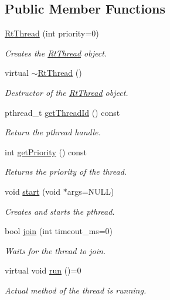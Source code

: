 \subsection*{\-Public \-Member \-Functions}
\begin{DoxyCompactItemize}
\item 
\hyperlink{class_u_s_u_1_1_rt_thread_a9b72ca126bc7f53871ec78635540e037}{\-Rt\-Thread} (int priority=0)
\begin{DoxyCompactList}\small\item\em \-Creates the \hyperlink{class_u_s_u_1_1_rt_thread}{\-Rt\-Thread} object. \end{DoxyCompactList}\item 
virtual \hyperlink{class_u_s_u_1_1_rt_thread_ab1ec23dd67ba0d1ad0193416a1ed8243}{$\sim$\-Rt\-Thread} ()
\begin{DoxyCompactList}\small\item\em \-Destructor of the \hyperlink{class_u_s_u_1_1_rt_thread}{\-Rt\-Thread} object. \end{DoxyCompactList}\item 
pthread\-\_\-t \hyperlink{class_u_s_u_1_1_rt_thread_a8432c713bb9f0fca217d822970b3ec54}{get\-Thread\-Id} () const 
\begin{DoxyCompactList}\small\item\em \-Return the pthread handle. \end{DoxyCompactList}\item 
int \hyperlink{class_u_s_u_1_1_rt_thread_ac26891d04e6b5fc487d5325ca0c90ead}{get\-Priority} () const 
\begin{DoxyCompactList}\small\item\em \-Returns the priority of the thread. \end{DoxyCompactList}\item 
void \hyperlink{class_u_s_u_1_1_rt_thread_aadd18e02db9c71911671936247d0ac70}{start} (void $\ast$args=\-N\-U\-L\-L)
\begin{DoxyCompactList}\small\item\em \-Creates and starts the pthread. \end{DoxyCompactList}\item 
bool \hyperlink{class_u_s_u_1_1_rt_thread_a3e86cb1e51e7966a6aa9ce06b154b73e}{join} (int timeout\-\_\-ms=0)
\begin{DoxyCompactList}\small\item\em \-Waits for the thread to join. \end{DoxyCompactList}\item 
virtual void \hyperlink{class_u_s_u_1_1_rt_thread_a858a5d475ed5b61759889b6608ff4372}{run} ()=0
\begin{DoxyCompactList}\small\item\em \-Actual method of the thread is running. \end{DoxyCompactList}\end{DoxyCompactItemize}
